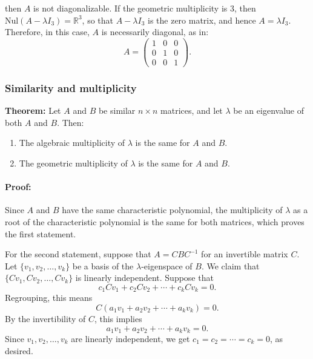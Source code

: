 \documentclass[a4paper,12pt]{article}
\begin{document}
\begin{enumerate}
\[    \]
    then \( A \) is not diagonalizable. If the geometric multiplicity is 3, then \( \text{Nul}(A - \lambda I_3) = \mathbb{R}^3 \), so that \( A - \lambda I_3 \) is the zero matrix, and hence \( A = \lambda I_3 \). Therefore, in this case, \( A \) is necessarily diagonal, as in:
    \[
    A = \begin{pmatrix} 1 & 0 & 0 \\ 0 & 1 & 0 \\ 0 & 0 & 1 \end{pmatrix}.
    \]
\end{enumerate}

\subsubsection{Similarity and multiplicity}
\begin{tcolorbox}[title=Theorem,colframe=blue!70!black, colback=blue!5!white]
\textbf{Theorem:} Let \( A \) and \( B \) be similar \( n \times n \) matrices, and let \( \lambda \) be an eigenvalue of both \( A \) and \( B \). Then:
\begin{enumerate}
    \item The algebraic multiplicity of \( \lambda \) is the same for \( A \) and \( B \).
    \item The geometric multiplicity of \( \lambda \) is the same for \( A \) and \( B \).
\end{enumerate}

\end{tcolorbox}

\paragraph{Proof:} Since \( A \) and \( B \) have the same characteristic polynomial, the multiplicity of \( \lambda \) as a root of the characteristic polynomial is the same for both matrices, which proves the first statement.

For the second statement, suppose that \( A = CBC^{-1} \) for an invertible matrix \( C \). Let \( \{ v_1, v_2, \dots, v_k \} \) be a basis of the \( \lambda \)-eigenspace of \( B \). We claim that \( \{ Cv_1, Cv_2, \dots, Cv_k \} \) is linearly independent. Suppose that
\[
c_1 Cv_1 + c_2 Cv_2 + \cdots + c_k Cv_k = 0.
\]
Regrouping, this means
\[
C (a_1 v_1 + a_2 v_2 + \cdots + a_k v_k) = 0.
\]
By the invertibility of \( C \), this implies
\[
a_1 v_1 + a_2 v_2 + \cdots + a_k v_k = 0.
\]
Since \( v_1, v_2, \dots, v_k \) are linearly independent, we get \( c_1 = c_2 = \cdots = c_k = 0 \), as desired.
\end{document}
